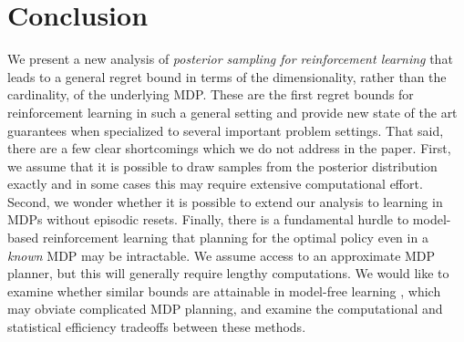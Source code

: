\documentclass{article}
\begin{document}
\section{Conclusion}
We present a new analysis of \emph{posterior sampling for reinforcement learning} that leads to a general regret bound in terms of the dimensionality, rather than the cardinality, of the underlying MDP.
These are the first regret bounds for reinforcement learning in such a general setting and provide new state of the art guarantees when specialized to several important problem settings.
That said, there are a few clear shortcomings which we do not address in the paper.
First, we assume that it is possible to draw samples from the posterior distribution exactly and in some cases this may require extensive computational effort.
Second, we wonder whether it is possible to extend our analysis to learning in MDPs without episodic resets.
Finally, there is a fundamental hurdle to model-based reinforcement learning that planning for the optimal policy even in a \emph{known} MDP may be intractable.
We assume access to an approximate MDP planner, but this will generally require lengthy computations.
We would like to examine whether similar bounds are attainable in model-free learning \cite{van2014generalization}, which may obviate complicated MDP planning, and examine the computational and statistical efficiency tradeoffs between these methods.


\newpage
\small{


}
\newpage




\appendix
\end{document}
